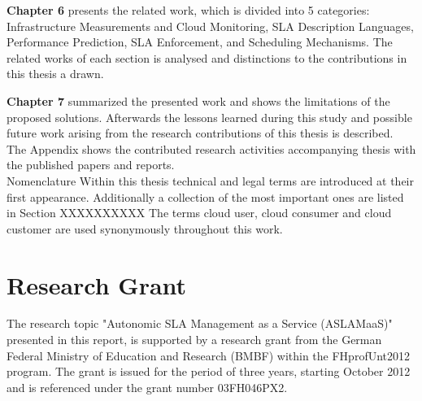 \textbf{Chapter 6} presents the related work, which is divided into 5 categories: Infrastructure Measurements and Cloud Monitoring, SLA Description Languages, Performance Prediction, SLA Enforcement, and Scheduling Mechanisms. The related works of each section is analysed and distinctions to the contributions in this thesis a drawn.

\textbf{Chapter 7} summarized the presented work and shows the  limitations of the proposed solutions. Afterwards the lessons learned during this study and possible future work arising from the research contributions of this thesis is described.\\

The Appendix shows the contributed research activities accompanying thesis with the published papers and reports. \\

Nomenclature
Within this thesis technical and legal terms are introduced at their first appearance. Additionally  a collection of the most important ones are listed in Section XXXXXXXXXX 
The terms cloud user, cloud consumer and cloud customer are used synonymously throughout this work.


\section{Research Grant}
The research topic "Autonomic SLA Management as a Service (ASLAMaaS)" presented in this report, is supported by a research grant from the German Federal Ministry of Education and Research (BMBF) within the FHprofUnt2012 program. The grant is issued for the period of three years, starting October 2012 and is referenced under the grant number 03FH046PX2.\cite{ASLAMaaS}

